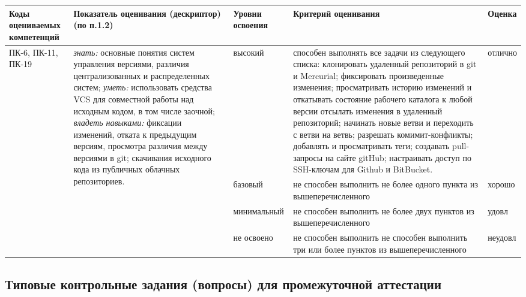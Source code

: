 \documentclass[a4paper,12pt]{article}
\begin{document}
\begin{longtable}{|p{15mm}|p{53mm}|p{16mm}|p{43mm}|p{14mm}|}
\hline
  \centering\small Коды оцениваемых компетенций
& \centering Показатель оценивания (дескриптор) (по п.1.2) 
& \centering\small Уровни освоения 
& \centering Критерий оценивания 
& \centering\small\arraybackslash Оценка
\\
\hline

\multirow{4}{15mm}{ПК-6, ПК-11, ПК-19}
&
\multirow{4}{53mm}{\parbox{53mm}{%
\vrule width 0pt height 10pt \emph{знать:}\newline
основные понятия систем управления версиями, различия централизованных и распределенных систем; \newline
\emph{уметь:}\newline
использовать средства VCS для совместной работы над исходным кодом, в том числе заочной; \newline
\emph{владеть навыками:}\newline
фиксации изменений, отката к предыдущим версиям, просмотра различия между версиями в git; скачивания исходного кода из публичных облачных репозиториев. 
}}
& 
высокий & \raggedright\arraybackslash способен выполнять все задачи из следующего списка:
клонировать удаленный репозиторий в git и Mercurial;
фиксировать произведенные изменения;
просматривать историю изменений и откатывать состояние рабочего каталога к любой версии
отсылать изменения в удаленный репозиторий;
начинать новые ветви и переходить с ветви на ветвь;
разрешать комимит-конфликты;
добавлять и просматривать теги;
создавать pull-запросы на сайте gitHub;
настраивать доступ по SSH-ключам для Github и BitBucket. & отлично 
\\ 

\cline{3-5}
& & базовый & не способен выполнить не более одного пункта из вышеперечисленного & хорошо 
\\

\cline{3-5}
& & мини\-мальный & не способен выполнить не более двух пунктов из вышеперечисленного & удовл 
\\

\cline{3-5}
& & не освоено & не способен выполнить не способен выполнить три или более пунктов из вышеперечисленного & неудовл 
\\

\hline

\end{longtable}



\subsection{Типовые контрольные задания (вопросы) для промежуточной аттестации}
\end{document}
